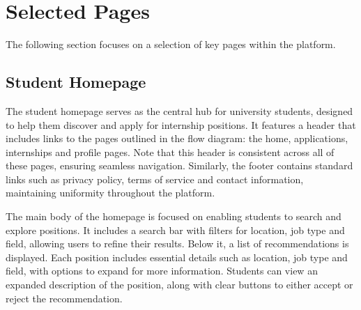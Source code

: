 \section{Selected Pages}
The following section focuses on a selection of key pages within the platform.

\newpage
\subsection{Student Homepage}
The student homepage serves as the central hub for university students, designed to help them discover and apply for internship positions.
It features a header that includes links to the pages outlined in the flow diagram: the home, applications, internships and profile pages.
Note that this header is consistent across all of these pages, ensuring seamless navigation.
Similarly, the footer contains standard links such as privacy policy, terms of service and contact information, maintaining uniformity throughout the platform.

The main body of the homepage is focused on enabling students to search and explore positions.
It includes a search bar with filters for location, job type and field, allowing users to refine their results.
Below it, a list of recommendations is displayed.
Each position includes essential details such as location, job type and field, with options to expand for more information.
Students can view an expanded description of the position, along with clear buttons to either accept or reject the recommendation.

